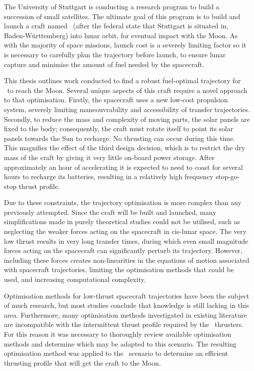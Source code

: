 
\vfill

The University of Stuttgart is conducting a research program to build a succession of small satellites. The ultimate goal of this program is to build and launch a craft named \BW\ (after the federal state that Stuttgart is situated in, Baden-W\"{u}rttemberg) into lunar orbit, for eventual impact with the Moon. As with the majority of space missions, launch cost is a severely limiting factor so it is necessary to carefully plan the trajectory before launch, to ensure lunar capture and minimise the amount of fuel needed by the spacecraft.

This thesis outlines work conducted to find a robust fuel-optimal trajectory for \BW\ to reach the Moon. Several unique aspects of this craft require a novel approach to that optimisation. Firstly, the spacecraft uses a new low-cost propulsion system, severely limiting maneouvrability and accessibility of transfer trajectories. Secondly, to reduce the mass and complexity of moving parts, the solar panels are fixed to the body; consequently, the craft must rotate itself to point its solar panels towards the Sun to recharge. No thrusting can occur during this time. This magnifies the effect of the third design decision, which is to restrict the dry mass of the craft by giving it very little on-board power storage. After approximately an hour of accelerating it is expected to need to coast for several hours to recharge its batteries, resulting in a relatively high frequency stop-go-stop thrust profile.

Due to these constraints, the trajectory optimisation is more complex than any previously attempted. Since the craft will be built and launched, many simplifications made in purely theoretical studies could not be utilised, such as neglecting the weaker forces acting on the spacecraft in cis-lunar space. The very low thrust results in very long transfer times, during which even small magnitude forces acting on the spacecraft can significantly perturb its trajectory. However, including these forces creates non-linearities in the equations of motion associated with spacecraft trajectories, limiting the optimisation methods that could be used, and increasing computational complexity.

Optimisation methods for low-thrust spacecraft trajectories have been the subject of much research, but most studies conclude that knowledge is still lacking in this area. Furthermore, many optimisation methods investigated in existing literature are incompatible with the intermittent thrust profile required by the \BW\ thrusters. For this reason it was necessary to thoroughly review available optimisation methods and determine which may be adapted to this scenario. The resulting optimisation method was applied to the \BW\ scenario to determine an efficient thrusting profile that will get the craft to the Moon.

